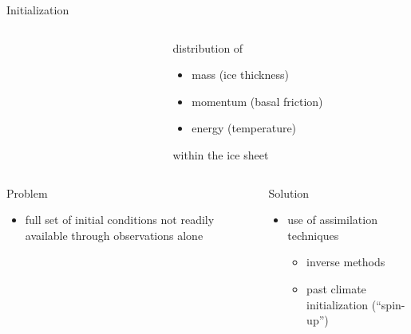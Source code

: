 \documentclass[hide notes,intlimits]{beamer}
\begin{document}
\begin{frame}{Initialization}
\begin{columns}[c]
\begin{column}{.5\textwidth}
\begin{figure}
      \end{figure}
    \end{column}
    \begin{column}{.5\textwidth}
      distribution of
      \begin{itemize}
      \item mass (ice thickness)
      \item momentum (basal friction)
      \item energy (temperature)
      \end{itemize}
      within the ice sheet
    \end{column}
  \end{columns}   
  \vspace{1em}
  \begin{columns}[t]
    \begin{column}{.5\textwidth}
      \begin{block}{Problem}
        \begin{itemize}
        \item full set of initial conditions not readily available through observations alone
        \end{itemize}
      \end{block}  
    \end{column}
    \begin{column}{.5\textwidth}
      \begin{block}{Solution}
        \begin{itemize}
        \item use of assimilation techniques
          \begin{itemize}
          \item inverse methods
          \item past climate initialization (``spin-up'')
          \end{itemize}
        \end{itemize}
      \end{block}
    \end{column}
  \end{columns}   
\end{frame}
\end{document}
